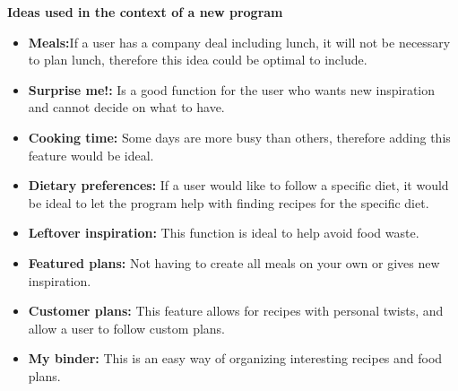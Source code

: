 \textbf{Ideas used in the context of a new program}
\begin{itemize}
  \item \textbf{Meals:}If a user has a company deal including lunch, it will not be necessary to plan lunch, therefore this idea could be optimal to include.
  \item \textbf{Surprise me!:} Is a good function for the user who wants new inspiration and cannot decide on what to have.
  \item \textbf{Cooking time:} Some days are more busy than others, therefore adding this feature would be ideal.
  \item \textbf{Dietary preferences:} If a user would like to follow a specific diet, it would be ideal to let the program help with finding recipes for the specific diet.
  \item \textbf{Leftover inspiration:} This function is ideal to help avoid food waste.
  \item \textbf{Featured plans:} Not having to create all meals on your own or gives new inspiration.
  \item \textbf{Customer plans:} This feature allows for recipes with personal twists, and allow a user to follow custom plans.
  \item \textbf{My binder:} This is an easy way of organizing interesting recipes and food plans. 
\end{itemize}
